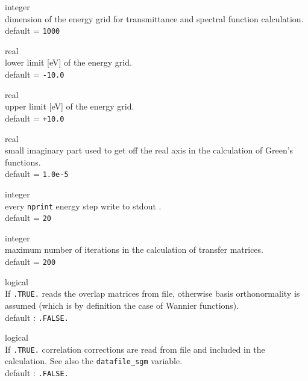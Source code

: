 {\noindent{}%
{\sc integer} \\ dimension of the energy grid for transmittance and spectral function
            calculation.\\ 
{\sc default} = {\tt 1000}\par

\noindent{}%
{\sc real} \\ lower limit [eV] of the energy grid. \\
{\sc default} = {\tt -10.0} \par

\noindent{}%
{\sc real} \\ upper limit [eV] of the energy grid. \\
{\sc default} = {\tt +10.0} \par

\noindent{}%
{\sc real} \\ small imaginary part used to get off the real axis in the calculation
            of Green's functions. \\ 
{\sc default} = {\tt 1.0e-5} \par

\noindent{}%
{\sc integer} \\ every {\tt nprint} energy step write to stdout .\\
{\sc default} = {\tt 20} \par

\noindent{}%
{\sc integer} \\ maximum number of iterations in the calculation of transfer 
                 matrices. \\ 
{\sc default} = { \tt 200} \par

\noindent{}%
{\sc logical} \\ If {\tt .TRUE.} reads the overlap matrices from file, 
otherwise basis orthonormality
            is assumed (which is by definition the case of Wannier functions). \\
            {\sc default} : {\tt .FALSE.} \par

\noindent{}%
{\sc logical} \\ If {\tt .TRUE.} correlation corrections are read from file and included
            in the calculation. See also the {\tt datafile\_sgm} variable. \\
            {\sc default} : {\tt .FALSE.} \par

}
